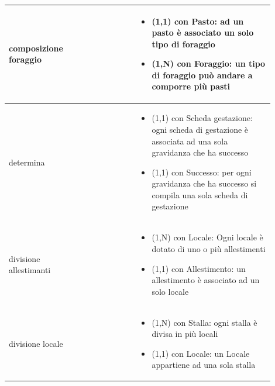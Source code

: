 \documentclass[12pt,a4paper]{article}
\begin{document}
\begin{center}
\begin{longtable}{|p{0.16\linewidth}|p{0.24\linewidth}|p{0.50\linewidth}|}
\hline
composizione foraggio 				& \begin{flushleft}\vspace{-15pt}  \end{flushleft}
					& \begin{itemize}
						\setlength{\itemindent}{-1em}
						\vspace{-25pt}
						\setlength\itemsep{-0.25em}
						\item (1,1) con Pasto: ad un pasto è associato un solo tipo di foraggio
						\item (1,N) con Foraggio: un tipo di foraggio può andare a comporre più pasti
					\end{itemize}\\ 

\hline
determina				& \begin{flushleft}\vspace{-15pt}  \end{flushleft}
					& \begin{itemize}
						\setlength{\itemindent}{-1em}
						\vspace{-25pt}
						\setlength\itemsep{-0.25em}
						\item (1,1) con Scheda gestazione: ogni scheda di gestazione è associata ad una sola gravidanza che ha successo
						\item (1,1) con Successo: per ogni gravidanza che ha successo si compila una sola scheda di gestazione
					\end{itemize}\\ 

\hline
divisione allestimanti 				& \begin{flushleft}\vspace{-15pt}  \end{flushleft}
					& \begin{itemize}
						\setlength{\itemindent}{-1em}
						\vspace{-25pt}
						\setlength\itemsep{-0.25em}
						\item (1,N) con Locale: Ogni locale è dotato di uno o più allestimenti
						\item (1,1) con Allestimento: un allestimento è associato ad un solo locale
					\end{itemize}\\ 

\hline
divisione locale 				& \begin{flushleft}\vspace{-15pt}  \end{flushleft}
					& \begin{itemize}
						\setlength{\itemindent}{-1em}
						\vspace{-25pt}
						\setlength\itemsep{-0.25em}
						\item (1,N) con Stalla: ogni stalla è divisa in più locali
						\item (1,1) con Locale: un Locale appartiene ad una sola stalla
					\end{itemize}\\ 


\end{longtable}
\end{center}
\end{document}

